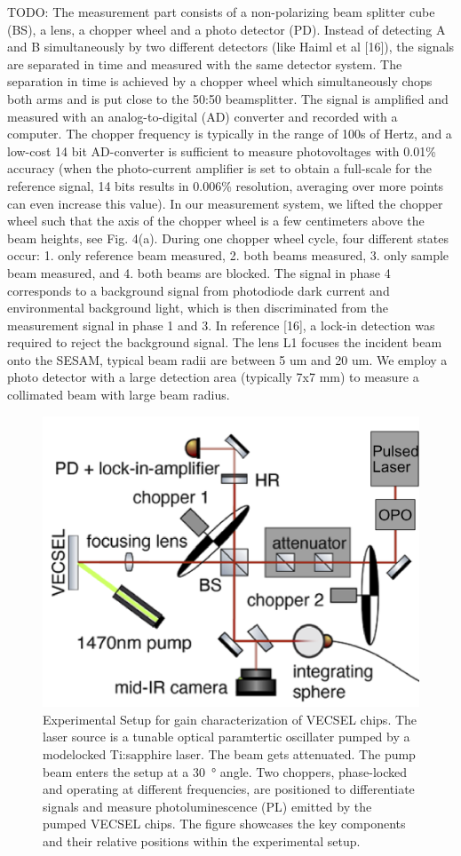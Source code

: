 TODO:
The measurement part consists of a non-polarizing beam splitter cube (BS), a lens, a
chopper wheel and a photo detector (PD). Instead of detecting A and B simultaneously by
two different detectors (like Haiml et al [16]), the signals are separated in time and measured
with the same detector system. The separation in time is achieved by a chopper wheel which
simultaneously chops both arms and is put close to the 50:50 beamsplitter. The signal is
amplified and measured with an analog-to-digital (AD) converter and recorded with a
computer. The chopper frequency is typically in the range of 100s of Hertz, and a low-cost 14
bit AD-converter is sufficient to measure photovoltages with 0.01\% accuracy (when the
photo-current amplifier is set to obtain a full-scale for the reference signal, 14 bits results in
0.006\% resolution, averaging over more points can even increase this value).
In our measurement system, we lifted the chopper wheel such that the axis of the chopper
wheel is a few centimeters above the beam heights, see Fig. 4(a). During one chopper wheel
cycle, four different states occur: 1. only reference beam measured, 2. both beams measured,
3. only sample beam measured, and 4. both beams are blocked. The signal in phase 4
corresponds to a background signal from photodiode dark current and environmental
background light, which is then discriminated from the measurement signal in phase 1 and 3.
In reference [16], a lock-in detection was required to reject the background signal.
The lens L1 focuses the incident beam onto the SESAM, typical beam radii are between
5 um and 20 um. We employ a photo detector with a large detection area (typically 7x7 mm)
to measure a collimated beam with large beam radius.

\begin{figure}[ht]
    \centering
    \includegraphics[width=0.8\linewidth]{images/setup.png}
    \caption{Experimental Setup for gain characterization of VECSEL chips. The laser source is a tunable optical paramtertic oscillater pumped by a modelocked Ti:sapphire laser. The beam gets attenuated. The pump beam enters the setup at a \qty{30}{\degree} angle. Two choppers, phase-locked and operating at different frequencies, are positioned to differentiate signals and measure photoluminescence (PL) emitted by the pumped VECSEL chips. The figure showcases the key components and their relative positions within the experimental setup.}
    \label{fig:setup}
\end{figure}

